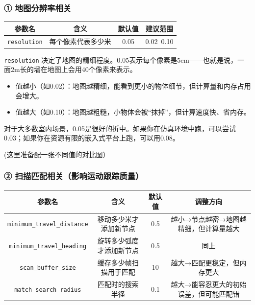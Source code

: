 \documentclass[UTF8,zihao=-4]{ctexart}
\DeclareRobustCommand{\code}[1]{\texttt{#1}}
\begin{document}
\subsubsection*{① 地图分辨率相关}

\begin{table}[h]
\centering
\begin{tabular}{|c|c|c|c|}
\hline
\textbf{参数名} & \textbf{含义} & \textbf{默认值} & \textbf{建议范围} \\
\hline
\code{resolution} & 每个像素代表多少米 & 0.05 & 0.02~0.10 \\
\hline
\end{tabular}
\end{table}

\code{resolution} 决定了地图的精细程度。0.05表示每个像素是5cm——也就是说，一面2m长的墙在地图上会用40个像素来表示。

\begin{itemize}
\item 值越小（如0.02）：地图越精细，能看到更小的物体细节，但计算量和内存占用会增大。
\item 值越大（如0.10）：地图越粗糙，小物体会被“抹掉”，但计算速度快、省内存。
\end{itemize}

对于大多数室内场景，0.05是很好的折中。如果你在仿真环境中跑，可以尝试0.03；如果你在资源有限的嵌入式平台上跑，可以用0.08。

(这里准备配一张不同值的对比图）
\subsubsection*{② 扫描匹配相关（影响运动跟踪质量）}

\begin{table}[h]
\centering
\begin{tabular}{|c|c|c|c|}
\hline
\textbf{参数名} & \textbf{含义} & \textbf{默认值} & \textbf{调整方向} \\
\hline
\code{minimum\_travel\_distance} & 移动多少米才添加新节点 & 0.5 & 越小→节点越密→地图越精细，但计算量越大 \\
\hline
\code{minimum\_travel\_heading} & 旋转多少弧度才添加新节点 & 0.5 & 同上 \\
\hline
\code{scan\_buffer\_size} & 缓存多少帧扫描用于匹配 & 10 & 越大→匹配更稳定，但内存更大 \\
\hline
\code{match\_search\_radius} & 匹配时的搜索半径 & 0.1 & 越大→能容忍更大的初始误差，但可能匹配错 \\
\hline
\end{tabular}
\end{table}
\end{document}
